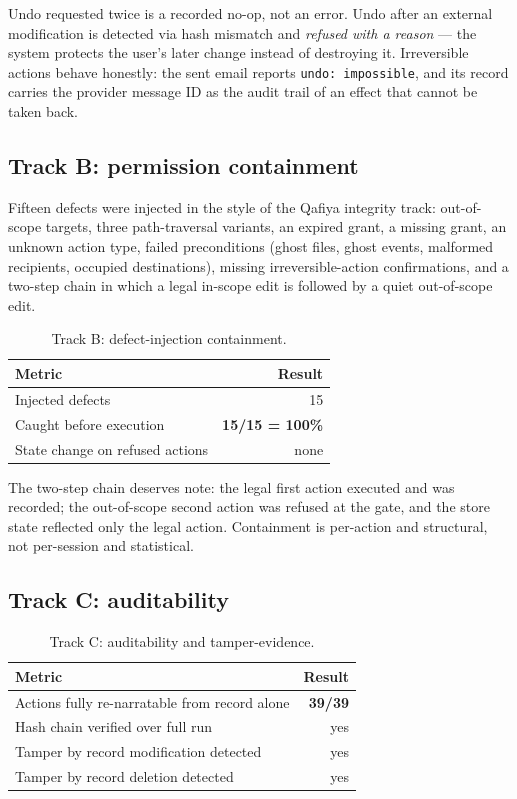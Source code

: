 \documentclass[11pt]{article}
\begin{document}
Undo requested twice is a
recorded no-op, not an error. Undo after an external modification is detected via
hash mismatch and \emph{refused with a reason} --- the system protects the user's
later change instead of destroying it. Irreversible actions behave honestly: the
sent email reports \texttt{undo: impossible}, and its record carries the provider
message ID as the audit trail of an effect that cannot be taken back.

\subsection{Track B: permission containment}

Fifteen defects were injected in the style of the Qafiya integrity track:
out-of-scope targets, three path-traversal variants, an expired grant, a missing
grant, an unknown action type, failed preconditions (ghost files, ghost events,
malformed recipients, occupied destinations), missing irreversible-action
confirmations, and a two-step chain in which a legal in-scope edit is followed by
a quiet out-of-scope edit.

\begin{table}[h]
\centering
\begin{tabular}{@{}lr@{}}
\toprule
Metric & Result \\
\midrule
Injected defects & 15 \\
Caught before execution & \textbf{15/15 = 100\%} \\
State change on refused actions & none \\
\bottomrule
\end{tabular}
\caption{Track B: defect-injection containment.}
\end{table}

The two-step chain deserves note: the legal first action executed and was
recorded; the out-of-scope second action was refused at the gate, and the store
state reflected only the legal action. Containment is per-action and structural,
not per-session and statistical.

\subsection{Track C: auditability}

\begin{table}[h]
\centering
\begin{tabular}{@{}lr@{}}
\toprule
Metric & Result \\
\midrule
Actions fully re-narratable from record alone & \textbf{39/39} \\
Hash chain verified over full run & yes \\
Tamper by record modification detected & yes \\
Tamper by record deletion detected & yes \\
\bottomrule
\end{tabular}
\caption{Track C: auditability and tamper-evidence.}
\end{table}
\end{document}
